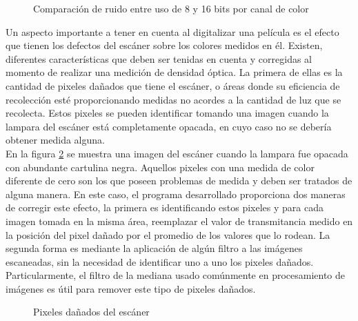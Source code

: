 \begin{figure}
	\centering
	
	\caption{Comparación de ruido entre uso de 8 y 16 bits por canal de color}
	\label{fig:ruidoBits}
\end{figure}

Un aspecto importante a tener en cuenta al digitalizar una película es el efecto que tienen los defectos del escáner sobre los colores medidos en él. Existen, diferentes características que deben ser tenidas en cuenta y corregidas al momento de realizar una medición de densidad óptica. La primera de ellas es la cantidad de pixeles dañados que tiene el escáner, o áreas donde su eficiencia de recolección esté proporcionando medidas no acordes a la cantidad de luz que se recolecta. Estos pixeles se pueden identificar tomando una imagen cuando la lampara del escáner está completamente opacada, en cuyo caso no se debería obtener medida alguna.  \\

En la figura \ref{fig:pixelesDanados} se muestra una imagen del escáner cuando la lampara fue opacada con abundante cartulina negra. Aquellos pixeles con una medida de color diferente de cero son los que poseen problemas de medida y deben ser tratados de alguna manera. En este caso, el programa desarrollado proporciona dos maneras de corregir este efecto, la primera es identificando estos pixeles y para cada imagen tomada en la misma área, reemplazar el valor de transmitancia medido en la posición del pixel dañado por el promedio de los valores que lo rodean. La segunda forma es mediante la aplicación de algún filtro a las imágenes escaneadas, sin la necesidad de identificar uno a uno los pixeles dañados. Particularmente, el filtro de la mediana usado comúnmente en procesamiento de imágenes es útil para remover este tipo de pixeles dañados.\\ 

\begin{figure}
	\centering
	
	\caption{Pixeles dañados del escáner}
	\label{fig:pixelesDanados}
\end{figure}

